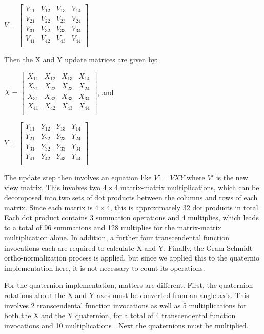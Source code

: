 \documentclass{acm_proc_article-sp}
\begin{document}
$V = \left[ \begin{array}{cccc}
    V_{11} & V_{12} & V_{13} & V_{14} \\
    V_{21} & V_{22} & V_{23} & V_{24} \\
    V_{31} & V_{32} & V_{33} & V_{34} \\
    V_{41} & V_{42} & V_{43} & V_{44} \\
\end{array} \right]$

Then the X and Y update matrices are given by:

\vspace{0.5em}
$X = \left[ \begin{array}{cccc}
    X_{11} & X_{12} & X_{13} & X_{14} \\
    X_{21} & X_{22} & X_{23} & X_{24} \\
    X_{31} & X_{32} & X_{33} & X_{34} \\
    X_{41} & X_{42} & X_{43} & X_{44} \\
\end{array} \right]$, and

$Y = \left[ \begin{array}{cccc}
    Y_{11} & Y_{12} & Y_{13} & Y_{14} \\
    Y_{21} & Y_{22} & Y_{23} & Y_{24} \\
    Y_{31} & Y_{32} & Y_{33} & Y_{34} \\
    Y_{41} & Y_{42} & Y_{43} & Y_{44} \\
\end{array} \right]$

The update step then involves an equation like $V\prime = VXY$ where $V\prime$ is the new view matrix.
This involves two $4 \times 4$ matrix-matrix multiplications, which can be decomposed into two sets of dot products between the columns and rows of each matrix.
Since each matrix is $4 \times 4$, this is approximately 32 dot products in total.
Each dot product contains 3 summation operations and 4 multiplies, which leads to a total of 96 summations and 128 multiplies for the matrix-matrix multiplication alone.
In addition, a further four transcendental function invocations each are required to calculate X and Y.
Finally, the Gram-Schmidt ortho-normalization process is applied, but since we applied this to the quaternio implementation here, it is not necessary to count its operations.

For the quaternion implementation, matters are different.
First, the quaternion rotations about the X and Y axes must be converted from an angle-axis.
This involves 2 transcendental function invocations as well as 5 multiplications for both the X and the Y quaternion, for a total of 4 transcendental function invocations and 10 multiplications \parencite{glm:quat:angleAxis}.
Next the quaternions must be multiplied.
\end{document}
